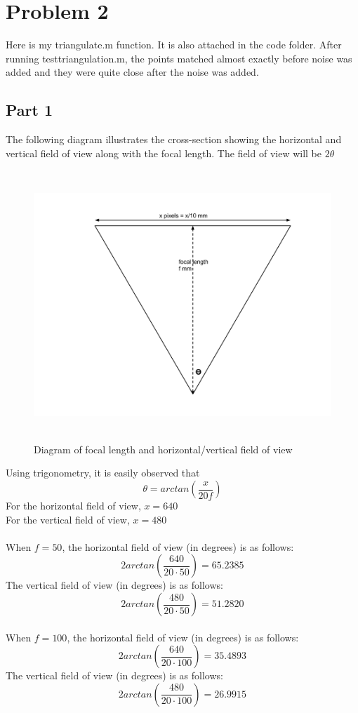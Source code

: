 \documentclass[11pt,psfig]{article}
\begin{document}
\section*{Problem 2}

Here is my triangulate.m function. It is also attached in the code folder. After running testtriangulation.m, the points matched almost exactly before noise was added and they were quite close after the noise was added.


\newpage

\subsection*{Part 1}

The following diagram illustrates the cross-section showing the horizontal and vertical field of view along with the focal length. The field of view will be $2\theta$

\begin{figure}[H]
\centering
\includegraphics[height=4in]{hw1prob2drawing1.png}
\caption{Diagram of focal length and horizontal/vertical field of view}
\end{figure}
\newpage
Using trigonometry, it is easily observed that
\[
\theta = arctan(\frac{x}{20f})
\]
For the horizontal field of view, $x=640$\\
For the vertical field of view, $x=480$ \\
\\
When $f=50$, the horizontal field of view (in degrees) is as follows: 
\[
2arctan(\frac{640}{20 \cdot 50}) = 65.2385
\]
The vertical field of view (in degrees) is as follows:
\[
2arctan(\frac{480}{20 \cdot 50}) = 51.2820
\]
\\
When $f=100$, the horizontal field of view (in degrees) is as follows: 
\[
2arctan(\frac{640}{20 \cdot 100}) = 35.4893
\]
The vertical field of view (in degrees) is as follows:
\[
2arctan(\frac{480}{20 \cdot 100}) = 26.9915
\]
\end{document}
